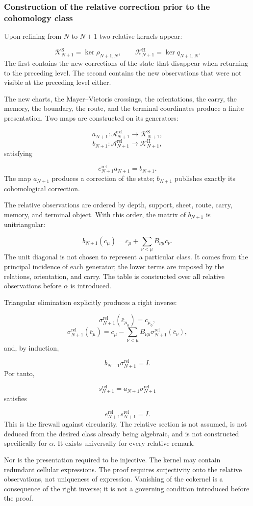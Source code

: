 \subsubsection{Construction of the relative correction prior to the cohomology class}
Upon refining from \(N\) to \(N+1\) two relative kernels appear:\par
\[
\mathscr K_{N+1}^{\mathrm S}
=
\ker\rho_{N+1,N},
\qquad
\mathscr K_{N+1}^{\mathrm H}
=
\ker q_{N+1,N}.
\]
The first contains the new corrections of the state that disappear when returning to the preceding level. The second contains the new observations that were not visible at the preceding level either.\par
The new charts, the Mayer–Vietoris crossings, the orientations, the carry, the memory, the boundary, the route, and the terminal coordinates produce a finite presentation. Two maps are constructed on its generators:\par
\[
a_{N+1}:
\mathscr A_{N+1}^{\mathrm{rel}}
\longrightarrow
\mathscr K_{N+1}^{\mathrm S},
\]
\[
b_{N+1}:
\mathscr A_{N+1}^{\mathrm{rel}}
\longrightarrow
\mathscr K_{N+1}^{\mathrm H},
\]
satisfying\par
\[
e_{N+1}^{\mathrm{rel}}a_{N+1}=b_{N+1}.
\]
The map \(a_{N+1}\) produces a correction of the state; \(b_{N+1}\) publishes exactly its cohomological correction.\par
The relative observations are ordered by depth, support, sheet, route, carry, memory, and terminal object. With this order, the matrix of \(b_{N+1}\) is unitriangular:\par
\[
b_{N+1}(c_\mu)
=
\bar c_\mu+
\sum_{\nu<\mu}
B_{\nu\mu}\bar c_\nu.
\]
The unit diagonal is not chosen to represent a particular class. It comes from the principal incidence of each generator; the lower terms are imposed by the relations, orientation, and carry. The table is constructed over all relative observations before \(\alpha\) is introduced.\par
Triangular elimination explicitly produces a right inverse:\par
\[
\sigma_{N+1}^{\mathrm{rel}}(\bar c_{\mu_0})=c_{\mu_0},
\]
\[
\sigma_{N+1}^{\mathrm{rel}}(\bar c_\mu)
=
c_\mu-
\sum_{\nu<\mu}
B_{\nu\mu}
\sigma_{N+1}^{\mathrm{rel}}(\bar c_\nu),
\]
and, by induction,\par
\[
b_{N+1}\sigma_{N+1}^{\mathrm{rel}}=I.
\]
Por tanto,\par
\[
s_{N+1}^{\mathrm{rel}}
=
a_{N+1}\sigma_{N+1}^{\mathrm{rel}}
\]
satisfies\par
\[
e_{N+1}^{\mathrm{rel}}
s_{N+1}^{\mathrm{rel}}
=I.
\]
This is the firewall against circularity. The relative section is not assumed, is not deduced from the desired class already being algebraic, and is not constructed specifically for \(\alpha\). It exists universally for every relative remark.\par
Nor is the presentation required to be injective. The kernel may contain redundant cellular expressions. The proof requires surjectivity onto the relative observations, not uniqueness of expression. Vanishing of the cokernel is a consequence of the right inverse; it is not a governing condition introduced before the proof.\par
{}

